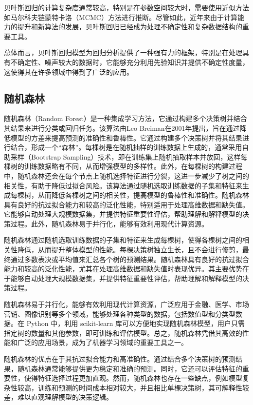 \documentclass[AutoFakeBold]{LZUThesis-PgD&PhD}
\begin{document}
	贝叶斯回归的计算复杂度通常较高，特别是在参数空间较大时，需要使用近似方法如马尔科夫链蒙特卡洛（MCMC）方法进行推断。尽管如此，近年来由于计算能力的提升和新算法的发展，贝叶斯回归已经成为处理不确定性和复杂数据结构的重要工具。
	
	总体而言，贝叶斯回归模型为回归分析提供了一种强有力的框架，特别是在处理具有不确定性、噪声较大的数据时，它能够充分利用先验知识并提供不确定性度量，这使得其在许多领域中得到了广泛的应用。
	\subsection{随机森林}
	
	随机森林（Random Forest）是一种集成学习方法，它通过构建多个决策树并结合其结果来进行分类或回归任务。该算法由Leo Breiman在2001年提出，旨在通过降低模型的方差来提高预测的准确性和鲁棒性。它通过构建多个决策树并将其结果进行结合，形成一个“森林”。每棵树是在随机抽样的训练数据上生成的，通常采用自助采样（Bootstrap Sampling）技术，即在训练集上随机抽取样本并放回，这样每棵树的训练数据略有不同，从而增强模型的多样性。此外，在每棵树的构建过程中，随机森林还会在每个节点上随机选择特征进行分裂，这进一步减少了树之间的相关性，有助于降低过拟合风险。该算法通过随机选取训练数据的子集和特征来生成每棵树，从而降低各棵树之间的相关性，提高模型的鲁棒性和准确性。随机森林具有良好的抗过拟合能力和较高的泛化性能，特别适用于处理高维数据和缺失值。它能够自动处理大规模数据集，并提供特征重要性评估，帮助理解和解释模型的决策过程。此外，随机森林易于并行化，能够有效利用现代计算资源。
	
	随机森林通过随机选取训练数据的子集和特征来生成每棵树，使得各棵树之间的相关性降低，从而提升整体模型的性能。每棵决策树独立生长，且不会进行修剪，最终通过多数表决或平均值来汇总各个树的预测结果。随机森林具有良好的抗过拟合能力和较高的泛化性能，尤其在处理高维数据和缺失值时表现优异。其主要优势在于能够自动处理大规模数据集，并提供特征重要性评估，帮助理解和解释模型的决策过程。
	
	随机森林易于并行化，能够有效利用现代计算资源，广泛应用于金融、医学、市场营销、图像识别等多个领域，能够处理各种类型的数据，包括数值型和分类型数据。在 Python 中，利用 scikit-learn 库可以方便地实现随机森林模型，用户只需指定树的数量和其他参数，即可训练和评估模型。总之，随机森林凭借其高效的性能和广泛的应用场景，成为了机器学习领域的重要工具之一。
	
	随机森林的优点在于其抗过拟合能力和高准确性。通过结合多个决策树的预测结果，随机森林通常能够提供更为稳定和准确的预测。同时，它还可以评估特征的重要性，使得特征选择过程更加直观。然而，随机森林也存在一些缺点，例如模型复杂性较高，训练和预测的时间成本相对较大，并且相比单棵决策树，其可解释性较差，难以直观理解模型的决策逻辑。
	
\end{document}

